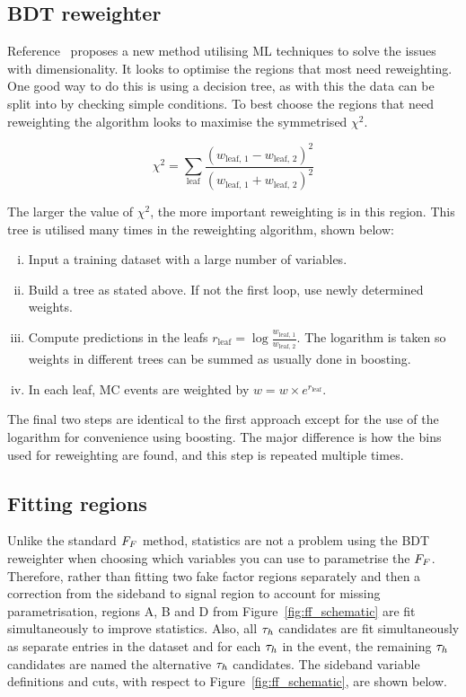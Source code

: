 \subsection{BDT reweighter}

Reference~\cite{Rogozhnikov:2016bdp} proposes a new method utilising \ac{ML} techniques to solve the issues with dimensionality. 
It looks to optimise the regions that most need reweighting. 
One good way to do this is using a decision tree, as with this the data can be split into  by checking simple conditions.
To best choose the regions that need reweighting the algorithm looks to maximise the symmetrised $\chi^2$.

\begin{equation}
\chi^2 = \sum_{\text{leaf}} \frac{(w_{\text{leaf, 1}}-w_{\text{leaf, 2}})^2}{(w_{\text{leaf, 1}}+w_{\text{leaf, 2}})^2}
\end{equation}

The larger the value of $\chi^2$, the more important reweighting is in this region. 
This tree is utilised many times in the reweighting algorithm, shown below:

\begin{enumerate}[i)]
\item Input a training dataset with a large number of variables.
\item Build a tree as stated above. If not the first loop, use newly determined weights.
\item Compute predictions in the leafs $r_{\text{leaf}} = \log\frac{w_{\text{leaf, 1}}}{w_{\text{leaf, 2}}}$. The logarithm is taken so weights in different trees can be summed as usually done in boosting.
\item In each leaf, \ac{MC} events are weighted by $w = w \times e^{r_{\text{leaf}}}$.
\end{enumerate}

The final two steps are identical to the first approach except for the use of the logarithm for convenience using boosting. 
The major difference is how the bins used for reweighting are found, and this step is repeated multiple times. \\

\subsection{Fitting regions}

Unlike the standard $F_{F}$ method, statistics are not a problem using the \ac{BDT} reweighter when choosing which variables you can use to parametrise the $F_{F}$. 
Therefore, rather than fitting two fake factor regions separately and then a correction from the sideband to signal region to account for missing parametrisation, regions A, B and D from Figure~\ref{fig:ff_schematic} are fit simultaneously to improve statistics. 
Also, all $\tau_{h}$ candidates are fit simultaneously as separate entries in the dataset and for each $\tau_{h}$ in the event, the remaining $\tau_{h}$ candidates are named the alternative $\tau_{h}$ candidates. 
The sideband variable definitions and cuts, with respect to Figure~\ref{fig:ff_schematic}, are shown below. \\

